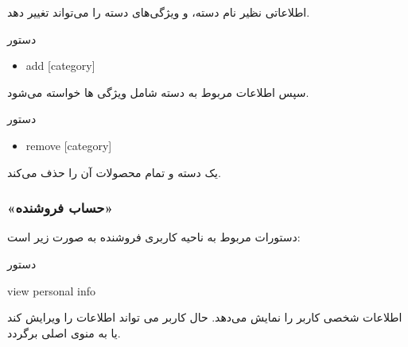 \documentclass[]{article}
\begin{document}
اطلاعاتی نظیر نام دسته، و ویژگی‌های دسته را می‌تواند تغییر دهد.


\begin{mybox}[colback=brilliantlavender]{دستور}

\begin{latin}

\begin{itemize}[label = {$\Rightarrow$}]

\item
add [category]

\end{itemize}

\end{latin}

\end{mybox}

سپس اطلاعات مربوط به دسته شامل ویژگی ها خواسته می‌شود.

\begin{mybox}[colback=brilliantlavender]{دستور}

\begin{latin}

\begin{itemize}[label = {$\Rightarrow$}]

\item
remove [category]

\end{itemize}

\end{latin}

\end{mybox}

یک دسته و تمام محصولات آن را حذف می‌کند.

\newpage


\subsubsection*{{\titr «حساب فروشنده»}}

دستورات مربوط به ناحیه کاربری فروشنده به صورت زیر است:

\begin{mybox}[colback=yellow]{دستور}

\begin{latin}

view personal info

\end{latin}

\end{mybox}

اطلاعات شخصی کاربر را نمایش می‌دهد. حال کاربر می تواند اطلاعات را ویرایش کند یا به منوی اصلی برگردد.
\end{document}
